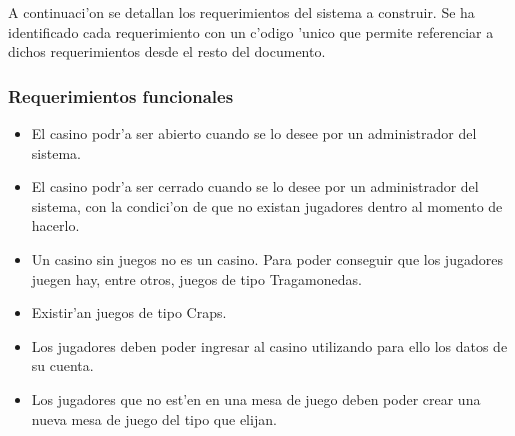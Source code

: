 A continuaci'on se detallan los requerimientos del sistema a construir. Se ha identificado cada requerimiento con un c'odigo 'unico que permite referenciar a dichos requerimientos desde el resto del documento.

\subsubsection{Requerimientos funcionales}



\begin{itemize}

\item {  

El casino podr'a ser abierto cuando se lo desee por un administrador del sistema. 
}


\item {} 

 El casino podr'a ser cerrado cuando se lo desee por un administrador del sistema, con la condici'on de que no existan jugadores dentro al momento de hacerlo.

\item {} 

 Un casino sin juegos no es un casino. Para poder conseguir que los jugadores juegen hay, entre otros, juegos de tipo Tragamonedas.

\item {} 

 Existir'an juegos de tipo Craps.

\item {} 

 Los jugadores deben poder ingresar al casino utilizando para ello los datos de su cuenta.

\item {} 

 Los jugadores que no est'en en una mesa de juego deben poder crear una nueva mesa de juego del tipo que elijan.


\end{itemize}
